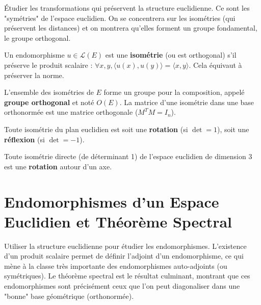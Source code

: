 \begin{objectif}
    Étudier les transformations qui préservent la structure euclidienne. Ce sont les "symétries" de l'espace euclidien. On se concentrera sur les isométries (qui préservent les distances) et on montrera qu'elles forment un groupe fondamental, le groupe orthogonal.
\end{objectif}

\begin{definition}
    Un endomorphisme $u \in \mathcal{L}(E)$ est une \textbf{isométrie} (ou est orthogonal) s'il préserve le produit scalaire : $\forall x,y, \langle u(x), u(y) \rangle = \langle x, y \rangle$.
    Cela équivaut à préserver la norme.
\end{definition}

\begin{definition}
    L'ensemble des isométries de $E$ forme un groupe pour la composition, appelé \textbf{groupe orthogonal} et noté $O(E)$.
    La matrice d'une isométrie dans une base orthonormée est une matrice orthogonale ($M^T M = I_n$).
\end{definition}

\begin{theorem}
    Toute isométrie du plan euclidien est soit une \textbf{rotation} (si $\det=1$), soit une \textbf{réflexion} (si $\det=-1$).
\end{theorem}

\begin{theorem}
    Toute isométrie directe (de déterminant 1) de l'espace euclidien de dimension 3 est une \textbf{rotation} autour d'un axe.
\end{theorem}

\section{Endomorphismes d'un Espace Euclidien et Théorème Spectral}

\begin{objectif}
    Utiliser la structure euclidienne pour étudier les endomorphismes. L'existence d'un produit scalaire permet de définir l'adjoint d'un endomorphisme, ce qui mène à la classe très importante des endomorphismes auto-adjoints (ou symétriques). Le théorème spectral est le résultat culminant, montrant que ces endomorphismes sont précisément ceux que l'on peut diagonaliser dans une "bonne" base géométrique (orthonormée).
\end{objectif}

